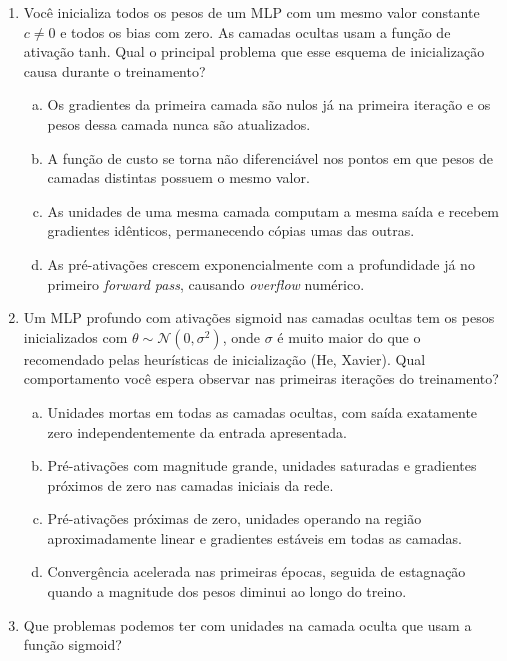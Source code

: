 \documentclass{dlproblemset}
\begin{document}
\begin{enumerate}[1)]
    \item Você inicializa todos os pesos de um MLP com um mesmo valor constante $c \neq 0$ e todos os bias com zero. As camadas ocultas usam a função de ativação tanh. Qual o principal problema que esse esquema de inicialização causa durante o treinamento?

    \begin{enumerate}[(a)]
        \item Os gradientes da primeira camada são nulos já na primeira iteração e os pesos dessa camada nunca são atualizados.
        \item A função de custo se torna não diferenciável nos pontos em que pesos de camadas distintas possuem o mesmo valor.
        \item As unidades de uma mesma camada computam a mesma saída e recebem gradientes idênticos, permanecendo cópias umas das outras.
        \item As pré-ativações crescem exponencialmente com a profundidade já no primeiro \textit{forward pass}, causando \textit{overflow} numérico.
    \end{enumerate}

    \item Um MLP profundo com ativações sigmoid nas camadas ocultas tem os pesos inicializados com $\theta \sim \mathcal{N}(0, \sigma^2)$, onde $\sigma$ é muito maior do que o recomendado pelas heurísticas de inicialização (He, Xavier). Qual comportamento você espera observar nas primeiras iterações do treinamento?

    \begin{enumerate}[(a)]
        \item Unidades mortas em todas as camadas ocultas, com saída exatamente zero independentemente da entrada apresentada.
        \item Pré-ativações com magnitude grande, unidades saturadas e gradientes próximos de zero nas camadas iniciais da rede.
        \item Pré-ativações próximas de zero, unidades operando na região aproximadamente linear e gradientes estáveis em todas as camadas.
        \item Convergência acelerada nas primeiras épocas, seguida de estagnação quando a magnitude dos pesos diminui ao longo do treino.
    \end{enumerate}

    \item Que problemas podemos ter com unidades na camada oculta que usam a função sigmoid?


\end{enumerate}
\end{document}
